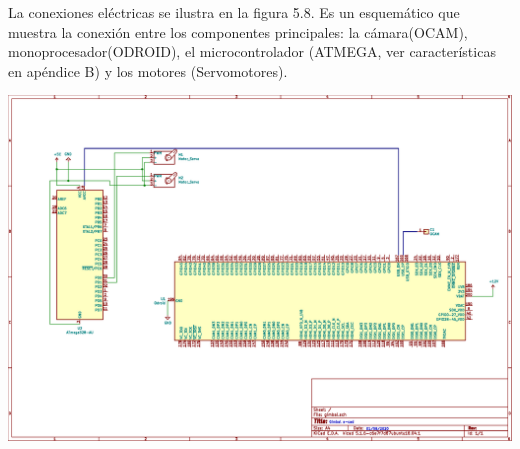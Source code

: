 La conexiones eléctricas se ilustra en la figura 5.8. Es un esquemático que muestra la conexión entre los componentes principales: la cámara(OCAM), monoprocesador(ODROID),
el microcontrolador (ATMEGA, ver características en apéndice B) y los motores (Servomotores).
\begin{center}
	\includegraphics[width=1.0\textwidth]{Contenido/Cuerpo/Capitulo5/Fig21.eps}
	\label{Fig1}
\end{center}




